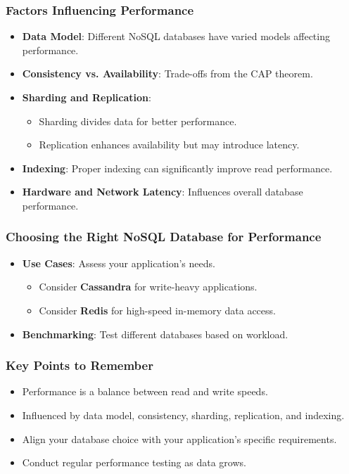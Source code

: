 \documentclass[aspectratio=169]{beamer}
\begin{document}
\begin{frame}[fragile]
    \frametitle{Factors Influencing Performance}
    \begin{itemize}
        \item \textbf{Data Model}: Different NoSQL databases have varied models affecting performance.
        \item \textbf{Consistency vs. Availability}: Trade-offs from the CAP theorem.
        \item \textbf{Sharding and Replication}:
            \begin{itemize}
                \item Sharding divides data for better performance.
                \item Replication enhances availability but may introduce latency.
            \end{itemize}
        \item \textbf{Indexing}: Proper indexing can significantly improve read performance.
        \item \textbf{Hardware and Network Latency}: Influences overall database performance.
    \end{itemize}
\end{frame}

\begin{frame}[fragile]
    \frametitle{Choosing the Right NoSQL Database for Performance}
    \begin{itemize}
        \item \textbf{Use Cases}: Assess your application's needs.
            \begin{itemize}
                \item Consider \textbf{Cassandra} for write-heavy applications.
                \item Consider \textbf{Redis} for high-speed in-memory data access.
            \end{itemize}
        \item \textbf{Benchmarking}: Test different databases based on workload.
    \end{itemize}
\end{frame}

\begin{frame}[fragile]
    \frametitle{Key Points to Remember}
    \begin{itemize}
        \item Performance is a balance between read and write speeds.
        \item Influenced by data model, consistency, sharding, replication, and indexing.
        \item Align your database choice with your application's specific requirements.
        \item Conduct regular performance testing as data grows.
    \end{itemize}
\end{frame}
\end{document}
